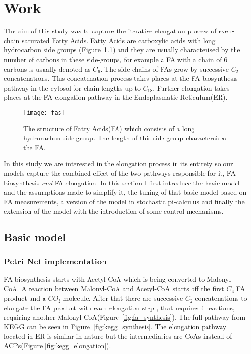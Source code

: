 \chapter{Work}
\label{chap:work}
\ifpdf
    \graphicspath{{Chapter3/Figs/Raster/}{Chapter3/Figs/PDF/}{Chapter3/Figs/}}
\else
    \graphicspath{{Chapter3/Figs/Vector/}{Chapter3/Figs/}}
\fi

The aim of this study was to capture the iterative elongation process
of even-chain saturated Fatty Acids. Fatty Acids are
carboxylic acids with long hydrocarbon side groups
(Figure~\ref{fig:fas}) and they are usually characterised by the
number of carbons in these side-groups, for example a FA with a chain
of 6 carbons is usually denoted as $C_6$. The side-chains of FAs grow
by successive $C_2$ concatenations. This concatenation process takes places at
the FA biosynthesis pathway in the cytosol for chain lengths up to
$C_{18}$. Further elongation takes places at the FA elongation
pathway in the Endoplasmatic Reticulum(ER).

\begin{figure}[htbp!]
\centering
\texttt{[image: fas]}
\caption[Fatty Acid structure]{The structure of Fatty Acids(FA) which
  consists of a long hydrocarbon side-group. The length of this
  side-group charactersises the FA.}
\label{fig:fas}
\end{figure}

In this study we are interested in the elongation process in its
entirety so our models capture the combined effect of the two pathways
responsible for it, FA biosynthesis \textit{and} FA elongation. In
this section I first introduce the basic model and the assumptions
made to simplify it, the tuning of that basic model based on FA
measurements, a version of the model in stochastic pi-calculus and
finally the extension of the model with the introduction of some
control mechanisms.

\section{Basic model}
\subsection{Petri Net implementation}
FA biosynthesis starts with Acetyl-CoA which is being converted to
Malonyl-CoA. A reaction between Malonyl-CoA and Acetyl-CoA starts off
the first $C_4$ FA product and a $CO_2$ molecule. After that there are successive $C_2$
concatenations to elongate the FA product with each elongation step
, that requires 4 reactions, requiring another Malonyl-CoA(Figure~\ref{fig:fa_synthesis}). The
full pathway from KEGG can be seen in
Figure~\ref{fig:kegg_synthesis}. The elongation pathway located in ER
is similar in nature but the intermediaries are CoAs instead of
ACPs(Figure \ref{fig:kegg_elongation}).

